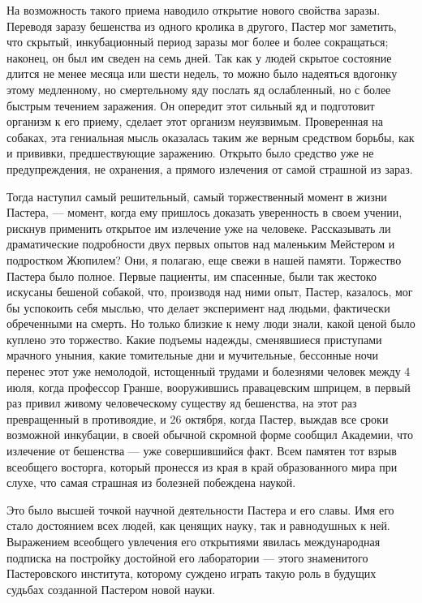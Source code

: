На возможность такого приема наводило открытие нового свойства заразы.
Переводя  заразу бешенства  из одного  кролика в  другого, Пастер  мог
заметить, что скрытый,  инкубационный период заразы мог  более и более
сокращаться; наконец, он  был им сведен на семь дней.  Так как у людей
скрытое  состояние  длится  не  менее  месяца  или  шести  недель,  то
можно было  надеяться вдогонку  этому медленному, но  смертельному яду
послать  яд ослабленный,  но с  более быстрым  течением заражения.  Он
опередит этот сильный  яд и подготовит организм к  его приему, сделает
этот  организм  неуязвимым.  Проверенная на  собаках,  эта  гениальная
мысль  оказалась таким  же верным  средством борьбы,  как и  прививки,
предшествующие заражению. Открыто было средство уже не предупреждения,
не охранения, а прямого излечения от самой страшной из зараз.

Тогда наступил  самый решительный, самый торжественный  момент в жизни
Пастера, --- момент,  когда ему пришлось доказать  уверенность в своем
учении,  рискнув  применить открытое  им  излечение  уже на  человеке.
Рассказывать  ли  драматические  подробности двух  первых  опытов  над
маленьким Мейстером и подростком Жюпилем?  Они, я полагаю, еще свежи в
нашей  памяти.  Торжество Пастера  было  полное.  Первые пациенты,  им
спасенные, были  так жестоко искусаны бешеной  собакой, что, производя
над ними  опыт, Пастер,  казалось, мог бы  успокоить себя  мыслью, что
делает эксперимент  над людьми,  фактически обреченными на  смерть. Но
только  близкие  к нему  люди  знали,  какой  ценой было  куплено  это
торжество.  Какие  подъемы  надежды, сменявшиеся  приступами  мрачного
уныния, какие  томительные дни  и мучительные, бессонные  ночи перенес
этот уже  немолодой, истощенный  трудами и  болезнями человек  между 4
июля,  когда профессор  Гранше, вооружившись  правацевским шприцем,  в
первый раз привил живому человеческому  существу яд бешенства, на этот
раз превращенный в противоядие, и 26 октября, когда Пастер, выждав все
сроки  возможной инкубации,  в  своей обычной  скромной форме  сообщил
Академии, что излечение от бешенства  --- уже совершившийся факт. Всем
памятен тот взрыв всеобщего восторга,  который пронесся из края в край
образованного мира при слухе, что самая страшная из болезней побеждена
наукой.

Это  было высшей  точкой  научной деятельности  Пастера  и его  славы.
Имя  его  стало  достоянием  всех  людей, как  ценящих  науку,  так  и
равнодушных  к  ней.  Выражением всеобщего  увлечения  его  открытиями
явилась международная подписка на  постройку достойной его лаборатории
--- этого знаменитого Пастеровского института, которому суждено играть
такую роль в будущих судьбах созданной Пастером новой науки.

